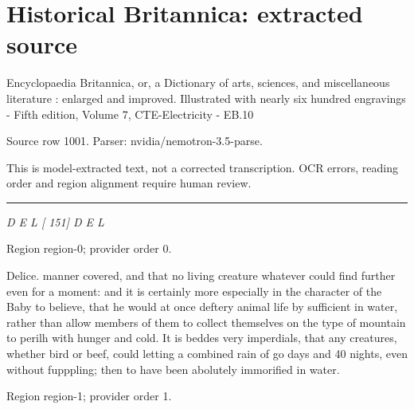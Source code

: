 \documentclass[11pt]{article}
\begin{document}
\section*{Historical Britannica: extracted source}
Encyclopaedia Britannica, or, a Dictionary of arts, sciences, and miscellaneous literature : enlarged and improved. Illustrated with nearly six hundred engravings - Fifth edition, Volume 7, CTE-Electricity - EB.10\par
{\small Source row 1001. Parser: nvidia/nemotron-3.5-parse.\par}
{\small This is model-extracted text, not a corrected transcription. OCR errors, reading order and region alignment require human review.\par}
\hrule\medskip
{\small\itshape D E L [ 151] D E L\par}

{\scriptsize\color{gray} Region region-0; provider order 0.\par}
\medskip

Delice. manner covered, and that no living creature whatever could find further even for a moment: and it is certainly more especially in the character of the Baby to believe, that he would at once deftery animal life by sufficient in water, rather than allow members of them to collect themselves on the type of mountain to perilh with hunger and cold. It is beddes very imperdials, that any creatures, whether bird or beef, could letting a combined rain of go days and 40 nights, even without fupppling; then to have been abolutely immorified in water.
\par

{\scriptsize\color{gray} Region region-1; provider order 1.\par}
\medskip
\end{document}
